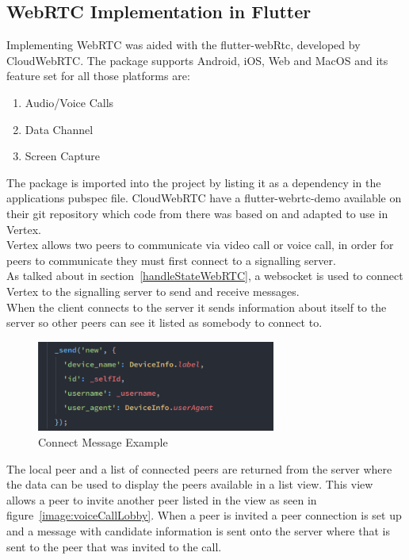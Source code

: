 \subsection{WebRTC Implementation in Flutter}
Implementing WebRTC was aided with the flutter-webRtc\cite{FlutterWebRTC}, developed by CloudWebRTC\cite{cloudWeb}. The package supports Android, iOS, Web and MacOS and its feature set for all those platforms are:
\begin{enumerate}
    \item Audio/Voice Calls
    \item Data Channel
    \item Screen Capture
\end{enumerate}
The package is imported into the project by listing it as a dependency in the applications pubspec file. CloudWebRTC have a flutter-webrtc-demo available on their git repository\cite{webrtc-demo} which code from there was based on and adapted to use in Vertex.
\\ Vertex allows two peers to communicate via video call or voice call, in order for peers to communicate they must first connect to a signalling server. 
\\ As talked about in section~\ref{handleStateWebRTC}, a websocket is used to connect Vertex to the signalling server to send and receive messages. 
\\ When the client connects to the server it sends information about itself to the server so other peers can see it listed as somebody to connect to. 

\begin{figure}[h!]
    \caption{Connect Message Example}
    \label{image:connectMessageExample}
    \centering
    \includegraphics[width=0.7\textwidth]{images/new_connnect_message.png}
\end{figure}

The local peer and a list of connected peers are returned from the server where the data can be used to display the peers available in a list view. This view allows a peer to invite another peer listed in the view as seen in figure~\ref{image:voiceCallLobby}. When a peer is invited a peer connection is set up and a message with candidate information is sent onto the server where that is sent to the peer that was invited to the call.

